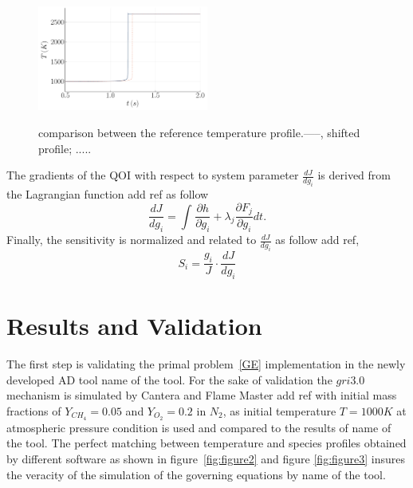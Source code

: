 \documentclass[preprint,review,12pt]{elsarticle}
\begin{document}
\begin{figure}
\centering
 {\includegraphics[width=0.5\textwidth]{figures/time shift without legend.pdf}}
\caption{comparison between the reference temperature profile.-----, shifted profile;  {\color{red} .....}   }
    \label{fig:figure1}
 \end{figure}
The gradients of the QOI with respect to system parameter $\frac{d J}{dg_i}$ is derived from the Lagrangian function {\color{red} add ref}  as follow 
\begin{equation}
\frac{d J}{dg_i}= \int_{}^{} \frac{\partial h}{\partial g_i}+\lambda_j\frac{\partial F_j}{\partial g_i}dt.
\end{equation}
Finally, the sensitivity is normalized and related to $\frac{d J}{dg_i}$ as follow  {\color{red} add ref}, 
\begin{equation}
S_i=\frac{g_i}{J}\cdot\frac{d J}{dg_i}
\end{equation}   



\section{Results and Validation}
The first step is validating the primal problem~\ref{GE} implementation in the newly developed AD tool  {\color{red} name of the tool}. For the sake of validation the $gri3.0$ mechanism is simulated by Cantera and Flame Master {\color{red} add ref} with initial mass fractions of $Y_{CH_4} = 0.05$ and $Y_{O_2} = 0.2$ in $N_2$, as initial temperature $T=1000 K$ at atmospheric pressure condition is used and compared to the results of {\color{red} name of the tool}. The perfect matching between temperature and species profiles obtained by different software as shown in figure~\ref{fig:figure2} and figure \ref{fig:figure3} insures the veracity of the simulation of the governing equations by {\color{red} name of the tool}.
\end{document}

